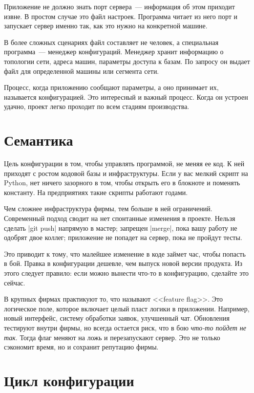 Приложение не должно знать порт сервера~--- информация об этом приходит извне. В
простом случае это файл настроек. Программа читает из него порт и запускает
сервер именно так, как это нужно на конкретной машине.

В более сложных сценариях файл составляет не человек, а специальная
программа~--- менеджер конфигураций. Менеджер хранит информацию о топологии
сети, адреса машин, параметры доступа к базам. По запросу он выдает файл для
определенной машины или сегмента сети.

Процесс, когда приложению сообщают параметры, а оно принимает их, называется
конфигурацией. Это интересный и важный процесс. Когда он устроен удачно, проект
легко проходит по всем стадиям производства.

\section{Семантика}

Цель конфигурации в том, чтобы управлять программой, не меняя ее код. К ней
приходят с ростом кодовой базы и инфраструктуры. Если у вас мелкий скрипт на
Python, нет ничего зазорного в том, чтобы открыть его в блокноте и поменять
константу. На предприятиях такие скрипты работают годами.

Чем сложнее инфраструктура фирмы, тем больше в ней ограничений. Современный
подход сводит на нет спонтанные изменения в проекте. Нельзя сделать \spverb|git push|
напрямую в мастер; запрещен \spverb|merge|, пока вашу работу не одобрят
двое коллег; приложение не попадет на сервер, пока не пройдут тесты.

Это приводит к тому, что малейшее изменение в коде займет час, чтобы попасть в
бой. Правка в конфигурации дешевле, чем выпуск новой версии продукта. Из этого
следует правило: если можно вынести что-то в конфигурацию, сделайте это сейчас.

\label{feature-flags}

В крупных фирмах практикуют то, что называют <<feature flag>>. Это логическое
поле, которое включает целый пласт логики в приложении. Например, новый
интерфейс, систему обработки заявок, улучшенный чат. Обновления тестируют внутри
фирмы, но всегда остается риск, что в бою \emph{что-то пойдет не так}. Тогда
флаг меняют на ложь и перезапускают сервер. Это не только сэкономит время, но и
сохранит репутацию фирмы.

\section{Цикл конфигурации}

